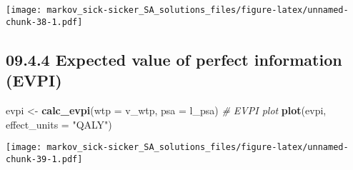 \documentclass[
]{article}
\newenvironment{Shaded}{\begin{snugshade}}{\end{snugshade}}
\newcommand{\CommentTok}[1]{\textcolor[rgb]{0.56,0.35,0.01}{\textit{#1}}}
\newcommand{\DataTypeTok}[1]{\textcolor[rgb]{0.13,0.29,0.53}{#1}}
\newcommand{\KeywordTok}[1]{\textcolor[rgb]{0.13,0.29,0.53}{\textbf{#1}}}
\newcommand{\NormalTok}[1]{#1}
\newcommand{\StringTok}[1]{\textcolor[rgb]{0.31,0.60,0.02}{#1}}
\begin{document}
\texttt{[image: markov\_sick-sicker\_SA\_solutions\_files/figure-latex/unnamed-chunk-38-1.pdf]}

\hypertarget{expected-value-of-perfect-information-evpi}{%
\subsection{09.4.4 Expected value of perfect information
(EVPI)}\label{expected-value-of-perfect-information-evpi}}

\begin{Shaded}
\begin{Highlighting}[]
\NormalTok{evpi <-}\StringTok{ }\KeywordTok{calc_evpi}\NormalTok{(}\DataTypeTok{wtp =}\NormalTok{ v_wtp, }\DataTypeTok{psa =}\NormalTok{ l_psa)}
\CommentTok{# EVPI plot}
\KeywordTok{plot}\NormalTok{(evpi, }\DataTypeTok{effect_units =} \StringTok{"QALY"}\NormalTok{)}
\end{Highlighting}
\end{Shaded}

\texttt{[image: markov\_sick-sicker\_SA\_solutions\_files/figure-latex/unnamed-chunk-39-1.pdf]}
\end{document}
